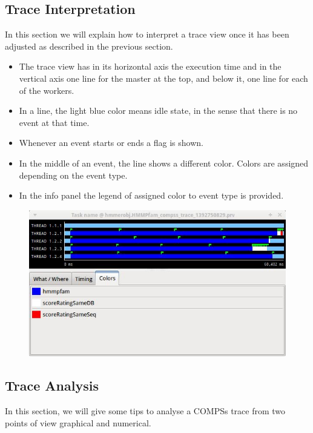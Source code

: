 \subsection{Trace Interpretation}
In this section we will explain how to interpret a trace view once it has been adjusted as described in the previous section.

\begin{itemize}
 \item The trace view has in its horizontal axis the execution time and in the vertical axis one line for the master at the top, and below it, one line for each of the workers.
 \item In a line, the light blue color means idle state, in the sense that there is no event at that time.
 \item Whenever an event starts or ends a flag is shown.
 \item In the middle of an event, the line shows a different color. Colors are assigned depending on the event type.
 \item In the info panel the legend of assigned color to event type is provided.
\end{itemize}

\begin{figure}[ht!]
  \centering
    \includegraphics[width=1.0\textwidth]{./Sections/7_Tracing/Figures/7.jpeg}
\end{figure}

\subsection{Trace Analysis}

In this section, we will give some tips to analyse a COMPSs trace from two points of view graphical and numerical.

